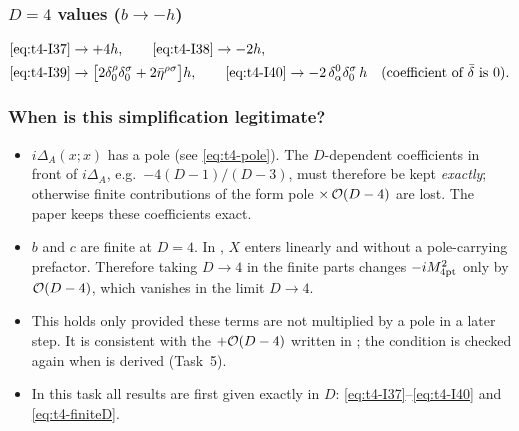 \subsubsection{\texorpdfstring{$D=4$}{D=4} values (\texorpdfstring{$b\to-h$}{b -> -h})}
\begin{equation}\label{eq:t4-finite4}
\begin{aligned}
\relax&\eqref{eq:t4-I37}\to+4h,\qquad \eqref{eq:t4-I38}\to-2h,\\
&\eqref{eq:t4-I39}\to\bigl[2\delta^\rho_0\delta^\sigma_0+2\bar\eta^{\rho\sigma}\bigr]h,\qquad
\eqref{eq:t4-I40}\to-2\,\delta^0_\alpha\delta^\sigma_0\,h\quad(\text{coefficient of }\bar\delta\text{ is }0).
\end{aligned}
\end{equation}

\subsubsection{When is this simplification legitimate? \texorpdfstring{\tA}{}}
\begin{itemize}
\item \(i\Delta_A(x;x)\) has a pole (see \eqref{eq:t4-pole}). The \(D\)-dependent coefficients in
front of \(i\Delta_A\), e.g.\ \(-4(D-1)/(D-3)\), must therefore be kept \emph{exactly};
otherwise finite contributions of the form pole \(\times\,\mathcal{O}\!\left(D-4\right)\) are lost. The paper
keeps these coefficients exact.
\item \(b\) and \(c\) are finite at \(D=4\). In , \(X\) enters linearly and without a
pole-carrying prefactor. Therefore taking \(D\to4\) in the finite parts changes
\(-iM^2_{\rm 4pt}\) only by \(\mathcal{O}\!\left(D-4\right)\), which vanishes in the limit \(D\to4\).
\item This holds only provided these terms are not multiplied by a pole in a later step. It
is consistent with the \(+\mathcal{O}\!\left(D-4\right)\) written in ; the condition is checked again
when  is derived (Task~5).
\item In this task all results are first given exactly in \(D\): \eqref{eq:t4-I37}--\eqref{eq:t4-I40}
and \eqref{eq:t4-finiteD}.
\end{itemize}

